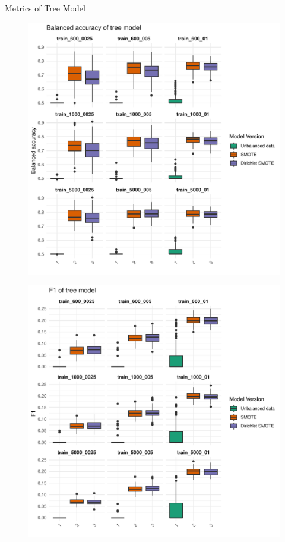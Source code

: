 \documentclass{beamer}
\begin{document}
\begin{frame}{Metrics of Tree Model}
  \begin{figure}
    \begin{minipage}{0.47\textwidth}
      \centering
      \includegraphics[width=\linewidth]{images/Tree_balanced_accuracy_default_threshold.pdf}
      \label{fig:label4}
    \end{minipage}
    \hfill
    \begin{minipage}{0.47\textwidth}
      \centering
      \includegraphics[width=\linewidth]{images/Tree_f1_default_threshold.pdf}

\end{minipage}
\end{figure}
\end{frame}
\end{document}
